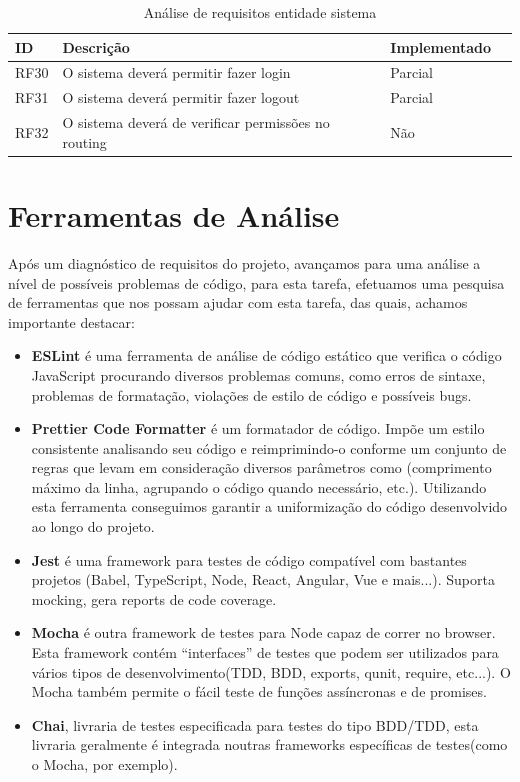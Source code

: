 \documentclass[a4paper,12pt]{article} %
\begin{document}
\begin{table}[H]
	\centering
	\begin{tabular}{|l|p{12cm}|l|r|}
		\hline
		\textbf{ID} & \textbf{Descrição} & \textbf{Implementado}\\
		\hline
		RF30 & O sistema deverá permitir fazer login & Parcial\footnotemark[4] \\
		\hline
		RF31 & O sistema deverá permitir fazer logout & Parcial\footnotemark[4] \\
		\hline
		RF32 & O sistema deverá de verificar permissões no routing & Não \\
		\hline
	\end{tabular}
	\caption{Análise de requisitos entidade sistema}
\end{table}

\newpage
\section{Ferramentas de Análise}
Após um diagnóstico de requisitos do projeto, avançamos para uma análise a nível de possíveis problemas de código, para esta tarefa, efetuamos uma pesquisa de ferramentas que nos possam ajudar com esta tarefa, das quais, achamos importante destacar:

\begin{itemize}
	\item \textbf{ESLint} é uma ferramenta de análise de código estático que verifica o código JavaScript procurando diversos problemas comuns, como erros de sintaxe, problemas de formatação, violações de estilo de código e possíveis bugs.

	\item \textbf{Prettier Code Formatter} é um formatador de código. Impõe um estilo consistente analisando seu código e reimprimindo-o conforme um conjunto de regras que levam em consideração diversos parâmetros como (comprimento máximo da linha, agrupando o código quando necessário, etc.). Utilizando esta ferramenta conseguimos garantir a uniformização do código desenvolvido ao longo do projeto.

	\item \textbf{Jest} é uma framework para testes de código compatível com bastantes projetos (Babel, TypeScript, Node, React, Angular, Vue e mais...). Suporta mocking, gera reports de code coverage.

	\item \textbf{Mocha} é outra framework de testes para Node capaz de correr no browser. Esta framework contém “interfaces” de testes que podem ser utilizados para vários tipos de desenvolvimento(TDD, BDD, exports, qunit, require, etc...). O Mocha também permite o fácil teste de funções assíncronas e de promises.

	\item \textbf{Chai}, livraria de testes especificada para testes do tipo BDD/TDD, esta livraria geralmente é integrada noutras frameworks específicas de testes(como o Mocha, por exemplo).
\end{itemize}
\end{document}
